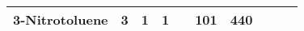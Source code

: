 \begin{landscape}
\begin{table}[H]
\begin{tabularx}{\linewidth}{XM{2.5cm}M{2.5cm}M{2.5cm}M{2.5cm}M{2.5cm}M{2.5cm}M{2.5cm}M{2.5cm}X}
3-Nitrotoluene & 3   &  1    & 1  &     &  101   & 440    &  &     &  
 \\ 
 
 




\bottomrule
\end{tabularx}
\end{table}
\end{landscape}

